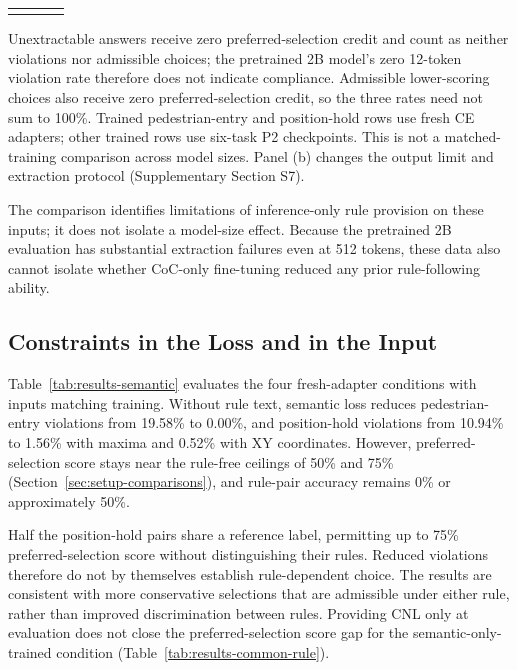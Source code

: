\begin{table}[tbp]
\begin{tabular*}{\textwidth}{@{\extracolsep\fill}lccc@{}}
\botrule
\end{tabular*}
\par\smallskip\raggedright
Unextractable answers receive zero preferred-selection credit and count as
neither violations nor admissible choices; the pretrained 2B model's zero
12-token violation rate therefore does not indicate compliance. Admissible
lower-scoring choices also receive zero preferred-selection credit, so the
three rates need not sum to 100\%. Trained pedestrian-entry and position-hold
rows use fresh CE adapters; other trained rows use six-task P2 checkpoints.
This is not a matched-training comparison across model sizes. Panel (b)
changes the output limit and extraction protocol (Supplementary Section S7).
\end{table}

The comparison identifies limitations of inference-only rule provision on
these inputs; it does not isolate a model-size effect. Because the pretrained
2B evaluation has substantial extraction failures even at 512 tokens, these
data also cannot isolate whether CoC-only fine-tuning reduced any prior
rule-following ability.

\subsection{Constraints in the Loss and in the Input}\label{sec:results-semantic}

Table~\ref{tab:results-semantic} evaluates the four fresh-adapter conditions
with inputs matching training. Without rule text, semantic loss reduces
pedestrian-entry violations from 19.58\% to 0.00\%, and position-hold
violations from 10.94\% to 1.56\% with maxima and 0.52\% with XY coordinates.
However, preferred-selection score stays near the rule-free ceilings of 50\% and 75\%
(Section~\ref{sec:setup-comparisons}), and rule-pair accuracy remains 0\%
or approximately 50\%.

Half the position-hold pairs share a reference label, permitting up to 75\%
preferred-selection score without distinguishing their rules. Reduced violations therefore do
not by themselves establish rule-dependent choice. The results are consistent
with more conservative selections that are admissible under either rule,
rather than improved discrimination between rules. Providing CNL only at
evaluation does not close the preferred-selection score gap for the semantic-only-trained
condition (Table~\ref{tab:results-common-rule}).

